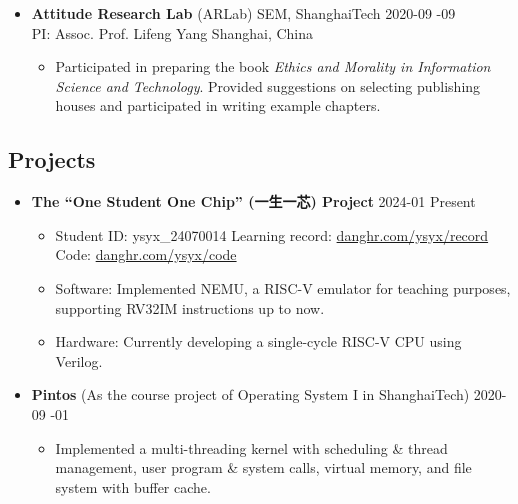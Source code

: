 \documentclass[a4paper,10pt]{ctexart} %
\begin{document}
\begin{keepsection}
\begin{itemize}
    \item \textbf{Attitude Research Lab} (ARLab) \quad SEM, ShanghaiTech \hfill 2020-09 -09 \\
    {\small PI: Assoc. Prof. Lifeng Yang} \hfill Shanghai, China
    \begin{small}
        \begin{itemize}
            \item Participated in preparing the book \textit{Ethics and Morality in Information Science and Technology}. Provided suggestions on selecting publishing houses and participated in writing example chapters.
        \end{itemize}
    \end{small}
\end{itemize}
\end{keepsection}

\begin{keepsection}
\subsection{Projects}
\begin{itemize}
    \item \textbf{The ``One Student One Chip'' (一生一芯) Project} \hfill 2024-01 \datetlide Present
    \begin{small}
        \begin{itemize}
            \item Student ID: ysyx\_24070014 \quad Learning record: \href{https://www.danghr.com/ysyx/record}{danghr.com/ysyx/record} \quad Code: \href{https://www.danghr.com/ysyx/code}{danghr.com/ysyx/code}
            \item Software: Implemented NEMU, a RISC-V emulator for teaching purposes, supporting RV32IM instructions up to now.
            \item Hardware: Currently developing a single-cycle RISC-V CPU using Verilog.
        \end{itemize}
    \end{small}
    \item \textbf{Pintos} {\small (As the course project of Operating System I in ShanghaiTech)} \hfill 2020-09 -01
    \begin{small}
        \begin{itemize}
            \item Implemented a multi-threading kernel with scheduling \& thread management, user program \& system calls, virtual memory, and file system with buffer cache.
        \end{itemize}
    \end{small}
\end{itemize}
\end{keepsection}
\end{document}
